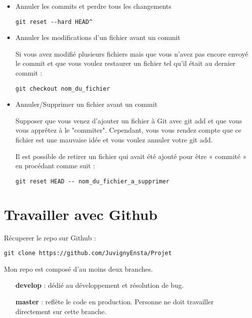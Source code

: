 \documentclass[fleqn,11pt]{article}
\begin{document}
\begin{itemize}
\item Annuler les commits et perdre tous les changements

\begin{lstlisting}
git reset --hard HEAD^
\end{lstlisting}

\item Annuler les modifications d’un fichier avant un commit

Si vous avez modifié plusieurs fichiers mais que vous n’avez pas encore envoyé le commit et que vous voulez restaurer un fichier tel qu’il était au dernier commit :

\begin{lstlisting}
git checkout nom_du_fichier
\end{lstlisting}

\item Annuler/Supprimer un fichier avant un commit

Supposer que vous venez d’ajouter un fichier à Git avec git add et que vous vous apprêtez à le "commiter". 
Cependant, vous vous rendez compte que ce fichier est une mauvaise idée et vous voulez annuler votre git add.

Il est possible de retirer un fichier qui avait été ajouté pour être « commité » en procédant comme suit :

\begin{lstlisting}
git reset HEAD -- nom_du_fichier_a_supprimer
\end{lstlisting}
\end{itemize}

\section{Travailler avec Github}

Récuperer le repo sur Github :

\begin{lstlisting}
git clone https://github.com/JuvignyEnsta/Projet
\end{lstlisting}

Mon repo est composé d'au moins deux branches.

\begin{itemize}
\item[\textbf{develop}] : dédié au développement et résolution de bug. 
\item[\textbf{master}] : reflète le code en production. Personne ne doit travailler directement sur cette branche.
\end{itemize}
\end{document}
